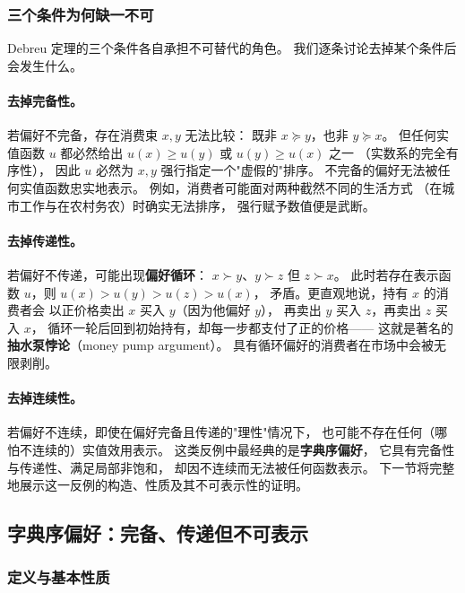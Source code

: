 \subsubsection{三个条件为何缺一不可}
\label{subsec:debreu-necessity}

Debreu 定理的三个条件各自承担不可替代的角色。
我们逐条讨论去掉某个条件后会发生什么。

\paragraph{去掉完备性。}
若偏好不完备，存在消费束 $x,y$ 无法比较：
既非 $x\succeq y$，也非 $y\succeq x$。
但任何实值函数 $u$ 都必然给出 $u(x)\geq u(y)$ 或 $u(y)\geq u(x)$ 之一
（实数系的完全有序性），
因此 $u$ 必然为 $x,y$ 强行指定一个"虚假的"排序。
不完备的偏好无法被任何实值函数忠实地表示。
例如，消费者可能面对两种截然不同的生活方式
（在城市工作与在农村务农）时确实无法排序，
强行赋予数值便是武断。

\paragraph{去掉传递性。}
若偏好不传递，可能出现\textbf{偏好循环}：
$x\succ y$、$y\succ z$ 但 $z\succ x$。
此时若存在表示函数 $u$，则 $u(x)>u(y)>u(z)>u(x)$，
矛盾。更直观地说，持有 $x$ 的消费者会
以正价格卖出 $x$ 买入 $y$（因为他偏好 $y$），
再卖出 $y$ 买入 $z$，再卖出 $z$ 买入 $x$，
循环一轮后回到初始持有，却每一步都支付了正的价格——
这就是著名的\textbf{抽水泵悖论}（money pump argument）。
具有循环偏好的消费者在市场中会被无限剥削。

\paragraph{去掉连续性。}
若偏好不连续，即使在偏好完备且传递的"理性"情况下，
也可能不存在任何（哪怕不连续的）实值效用表示。
这类反例中最经典的是\textbf{字典序偏好}，
它具有完备性与传递性、满足局部非饱和，
却因不连续而无法被任何函数表示。
下一节将完整地展示这一反例的构造、性质及其不可表示性的证明。

\subsection{字典序偏好：完备、传递但不可表示}
\label{sec:lexicographic}

\subsubsection{定义与基本性质}
\label{subsec:lex-def}

